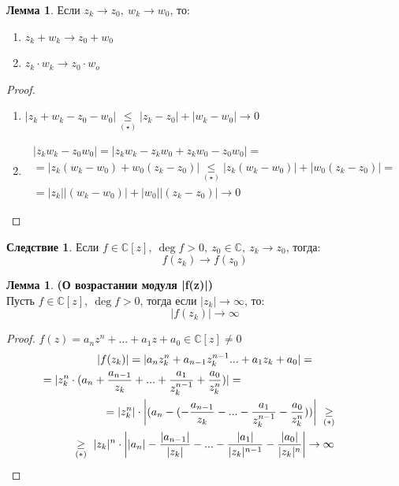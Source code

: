 \documentclass[a4paper, 12pt]{article}
\newcommand\tab[1][.5cm]{\hspace*{#1}}
\newcounter{lemcount}
\newcounter{lemcount2}
\theoremstyle{definition}
\newtheorem*{consequense}{Следствие}
\newtheorem{lemmanum}[lemcount]{Лемма}
\begin{document}
  \begin{lemmanum}
    Если $z_k \to z_0, \ w_k \to w_0$, то:
    \begin{enumerate}
      \item $z_k + w_k \to z_0 + w_0$
      \item $z_k \cdot w_k \to z_0 \cdot w_o$  
    \end{enumerate}
  \end{lemmanum} 
  \begin{proof}\tab
    \begin{enumerate}
      \item $|z_k+w_k-z_0-w_0| \underset{(\star)}{\leq} |z_k - z_0| + |w_k - w_0| \to 0$
      \item 
      \begin{multline*}
        |z_k w_k-z_0w_0| = |z_k w_k-z_kw_0 + z_k w_0-z_0w_0 | =\\
        = |z_k(w_k - w_0) + w_0(z_k - z_0)| \underset{(\star)}{\leq}  |z_k(w_k - w_0)| + |w_0(z_k - z_0)| =\\
        = |z_k||(w_k - w_0)| + |w_0||(z_k - z_0)| \to 0
      \end{multline*}
    \end{enumerate}
  \end{proof} 
  \begin{consequense}
    Если $f \in \mathbb{C}[z], \ \deg f >0, \ z_0 \in \mathbb{C}, \ z_k \to z_0$, тогда: 
    $$f(z_k) \to f(z_0)$$  
  \end{consequense}
  \begin{lemmanum} \textbf{(О возрастании модуля |f(z)|)} \\
    Пусть $f \in \mathbb{C}[z], \ \deg f >0$, тогда если $|z_k| \to \infty$, то:
    $$|f(z_k)| \to \infty$$        
  \end{lemmanum} 
  \begin{proof}
    $f(z) = a_nz^n + ... + a_1z+a_0 \in \mathbb{C}[z] \neq 0$
    \begin{multline*}
      |f(z_k)| = |a_nz_k^n + a_{n-1}z_k^{n-1}... + a_1z_k+a_0| =\\
      \tab[-4cm]= |z_k^n \cdot (a_n+\frac{a_{n-1}}{z_k} + ... + \frac{a_{1}}{z_k^{n-1}} + \frac{a_{0}}{z_k^{n}})|=\\
      \tab[1cm]= |z_k^n| \cdot \left|(a_n - (-\frac{a_{n-1}}{z_k} - ... - \frac{a_{1}}{z_k^{n-1}} - \frac{a_{0}}{z_k^{n}}))\right| \ \underset{(*)}{\geq}\\
      \underset{(*)}{\geq} \ |z_k|^n \cdot \left||a_n|-\frac{|a_{n-1}|}{|z_k|} - ... - \frac{|a_{1}|}{|z_k|^{n-1}} - \frac{|a_{0}|}{|z_k|^{n}}\right| \to \infty
    \end{multline*} 
  \end{proof} 
\end{document}
